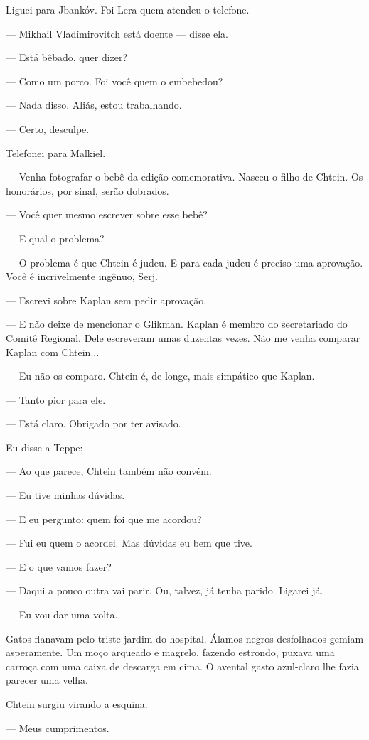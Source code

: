 Liguei para Jbankóv. Foi Lera quem atendeu o telefone.

--- Mikhail Vladímirovitch está doente --- disse ela.

--- Está bêbado, quer dizer?

--- Como um porco. Foi você quem o embebedou?

--- Nada disso. Aliás, estou trabalhando.

--- Certo, desculpe.

Telefonei para Malkiel.

--- Venha fotografar o bebê da edição comemorativa. Nasceu o filho de
Chtein. Os honorários, por sinal, serão dobrados.

--- Você quer mesmo escrever sobre esse bebê?

--- E qual o problema?

--- O problema é que Chtein é judeu. E para cada judeu é preciso uma
aprovação. Você é incrivelmente ingênuo, Serj.

--- Escrevi sobre Kaplan sem pedir aprovação.

--- E não deixe de mencionar o Glikman. Kaplan é membro do secretariado
do Comitê Regional. Dele escreveram umas duzentas vezes. Não me venha
comparar Kaplan com Chtein...

--- Eu não os comparo. Chtein é, de longe, mais simpático que Kaplan.

--- Tanto pior para ele.

--- Está claro. Obrigado por ter avisado.

Eu disse a Teppe:

--- Ao que parece, Chtein também não convém.

--- Eu tive minhas dúvidas.

--- E eu pergunto: quem foi que me acordou?

--- Fui eu quem o acordei. Mas dúvidas eu bem que tive.

--- E o que vamos fazer?

--- Daqui a pouco outra vai parir. Ou, talvez, já tenha parido. Ligarei
já.

--- Eu vou dar uma volta.

Gatos flanavam pelo triste jardim do hospital. Álamos negros desfolhados
gemiam asperamente. Um moço arqueado e magrelo, fazendo estrondo, puxava
uma carroça com uma caixa de descarga em cima. O avental gasto
azul-claro lhe fazia parecer uma velha.

Chtein surgiu virando a esquina.

--- Meus cumprimentos.

